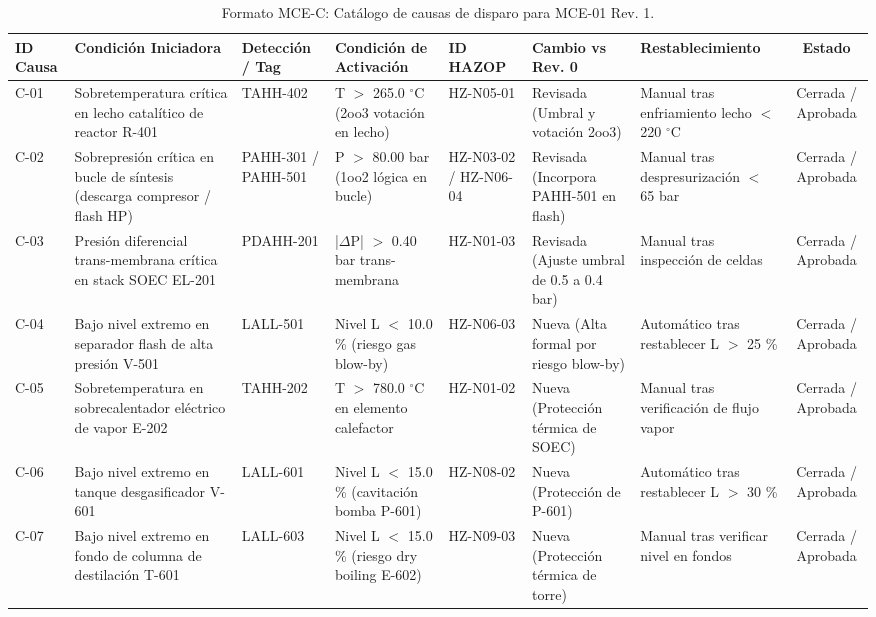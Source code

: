 \documentclass[10pt,letterpaper]{article}
\begin{document}
\begin{table}[H]
\centering\footnotesize
\caption{Formato MCE-C: Catálogo de causas de disparo para MCE-01 Rev. 1.} \label{tab:mcec_tabla}
\begin{tabularx}{\textwidth}{|l|X|p{2.2cm}|p{2.6cm}|l|p{2.4cm}|p{2.2cm}|c|}
\hline
\rowcolor{tableheader}\color{white}\textbf{ID Causa} & \color{white}\textbf{Condición Iniciadora} & \color{white}\textbf{Detección / Tag} & \color{white}\textbf{Condición de Activación} & \color{white}\textbf{ID HAZOP} & \color{white}\textbf{Cambio vs Rev. 0} & \color{white}\textbf{Restablecimiento} & \color{white}\textbf{Estado} \\ \hline
C-01 & Sobretemperatura crítica en lecho catalítico de reactor R-401 & TAHH-402 & T $>$ 265.0 $^\circ$C (2oo3 votación en lecho) & HZ-N05-01 & Revisada (Umbral y votación 2oo3) & Manual tras enfriamiento lecho $<$ 220 $^\circ$C & Cerrada / Aprobada \\ \hline
C-02 & Sobrepresión crítica en bucle de síntesis (descarga compresor / flash HP) & PAHH-301 / PAHH-501 & P $>$ 80.00 bar (1oo2 lógica en bucle) & HZ-N03-02 / HZ-N06-04 & Revisada (Incorpora PAHH-501 en flash) & Manual tras despresurización $<$ 65 bar & Cerrada / Aprobada \\ \hline
C-03 & Presión diferencial trans-membrana crítica en stack SOEC EL-201 & PDAHH-201 & |$\Delta$P| $>$ 0.40 bar trans-membrana & HZ-N01-03 & Revisada (Ajuste umbral de 0.5 a 0.4 bar) & Manual tras inspección de celdas & Cerrada / Aprobada \\ \hline
C-04 & Bajo nivel extremo en separador flash de alta presión V-501 & LALL-501 & Nivel L $<$ 10.0 \% (riesgo gas blow-by) & HZ-N06-03 & Nueva (Alta formal por riesgo blow-by) & Automático tras restablecer L $>$ 25 \% & Cerrada / Aprobada \\ \hline
C-05 & Sobretemperatura en sobrecalentador eléctrico de vapor E-202 & TAHH-202 & T $>$ 780.0 $^\circ$C en elemento calefactor & HZ-N01-02 & Nueva (Protección térmica de SOEC) & Manual tras verificación de flujo vapor & Cerrada / Aprobada \\ \hline
C-06 & Bajo nivel extremo en tanque desgasificador V-601 & LALL-601 & Nivel L $<$ 15.0 \% (cavitación bomba P-601) & HZ-N08-02 & Nueva (Protección de P-601) & Automático tras restablecer L $>$ 30 \% & Cerrada / Aprobada \\ \hline
C-07 & Bajo nivel extremo en fondo de columna de destilación T-601 & LALL-603 & Nivel L $<$ 15.0 \% (riesgo dry boiling E-602) & HZ-N09-03 & Nueva (Protección térmica de torre) & Manual tras verificar nivel en fondos & Cerrada / Aprobada \\ \hline

\end{tabularx}
\end{table}
\end{document}
